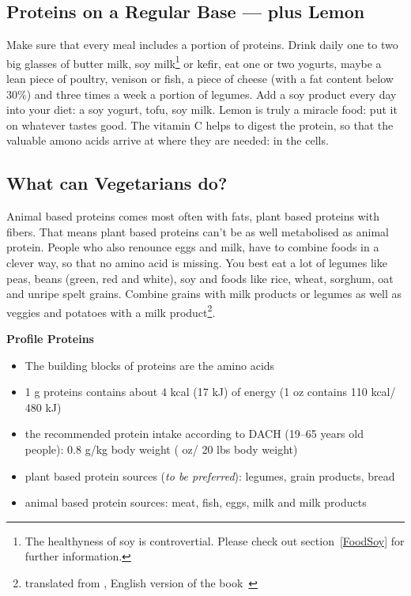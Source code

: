 \documentclass[../main.tex]{subfiles}
\begin{document}
      \subsection{Proteins on a Regular Base --- plus Lemon}

      Make sure that every meal includes a portion of proteins.
      Drink daily one to two big glasses of butter milk,
      soy milk\footnote{The healthyness of soy is controvertial. Please check out section~\ref{FoodSoy} for further information.}
      or kefir, eat one or two yogurts, maybe a lean piece of poultry, venison or fish,
      a piece of cheese (with a fat content below 30\%) and three times a week a portion of legumes.
      Add a soy product every day into your diet: a soy yogurt, tofu, soy milk.
      Lemon is truly a miracle food: put it on whatever tastes good.
      The vitamin C helps to digest the protein, so that the valuable amono acids arrive at where they are needed: in the cells.

      \subsection{What can Vegetarians do?}

      Animal based proteins comes most often with fats, plant based proteins with fibers.
      That means plant based proteins can't be as well metabolised as animal protein.
      People who also renounce eggs and milk, have to combine foods in a clever way, so that no amino acid is missing.
      You best eat a lot of legumes like peas, beans (green, red and white), soy and foods like rice, wheat, sorghum, oat and unripe spelt grains.
      Combine grains with milk products or legumes as well as veggies and potatoes with a
      milk product\footnote{translated from \cite{GLYX}, English version of the book~\cite{GLYX-En}}.

      
\vspace{5mm}
\noindent
\begin{fminipage}{\textwidth}
  \textbf{Profile Proteins}
  \begin{itemize}
  \item The building blocks of proteins are the amino acids
  \item 1 g proteins contains about 4 kcal (17 kJ) of energy (1 oz contains 110 kcal/ 480 kJ)
  \item the recommended protein intake according to DACH (19--65 years old people): 0.8 g/kg body weight ( oz/ 20 lbs body weight)
  \item plant based protein sources (\emph{to be preferred}): legumes, grain products, bread
    \item animal based protein sources: meat, fish, eggs, milk and milk products
  \end{itemize}
\end{fminipage}
\end{document}

